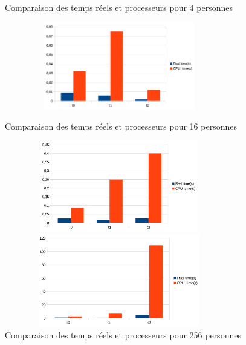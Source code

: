 \documentclass[11pt]{article} %
\begin{document}
\begin{figure}[!h]
  \centering
\caption{Comparaison des temps réels et processeurs pour 4 personnes}

\includegraphics[width=10cm, height=3.8cm]{p4}

 \caption{Comparaison des temps réels et processeurs pour 16 personnes}

\includegraphics[width=10cm,height=4cm]{p16}

 \caption{Comparaison des temps réels et processeurs pour 256 personnes}

\includegraphics[width=10cm,height=4cm]{p256}
\end{figure}


\newpage
\end{document}
